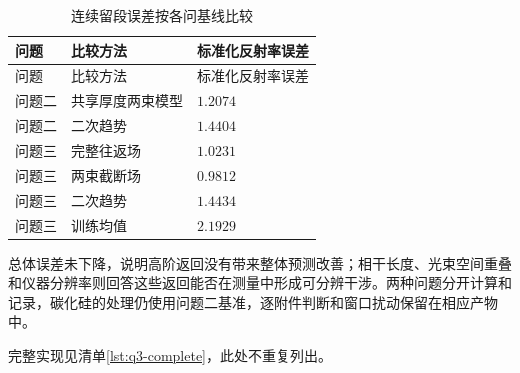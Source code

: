 \begingroup
\small
\begin{longtable}{>{\centering\arraybackslash}p{}>{\centering\arraybackslash}p{}>{\centering\arraybackslash}p{}}
\caption{连续留段误差按各问基线比较}\label{tab:app-comparison}\\
\toprule
问题 & 比较方法 & 标准化反射率误差 \\
\midrule
\endfirsthead
\toprule
问题 & 比较方法 & 标准化反射率误差 \\
\midrule
\endhead
\bottomrule
\endfoot
问题二 & 共享厚度两束模型 & $1.2074$ \\
问题二 & 二次趋势 & $1.4404$ \\
问题三 & 完整往返场 & $1.0231$ \\
问题三 & 两束截断场 & $0.9812$ \\
问题三 & 二次趋势 & $1.4434$ \\
问题三 & 训练均值 & $2.1929$ \\
\end{longtable}
\endgroup

总体误差未下降，说明高阶返回没有带来整体预测改善；相干长度、光束空间重叠和仪器分辨率则回答这些返回能否在测量中形成可分辨干涉。两种问题分开计算和记录，碳化硅的处理仍使用问题二基准，逐附件判断和窗口扰动保留在相应产物中。

\begingroup
{}
完整实现见清单\ref{lst:q3-complete}，此处不重复列出。
\endgroup

